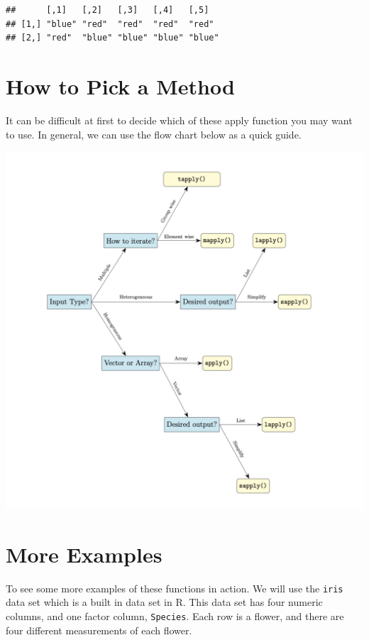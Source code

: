 \documentclass[
]{book}
\begin{document}
\begin{verbatim}
##      [,1]   [,2]   [,3]   [,4]   [,5]  
## [1,] "blue" "red"  "red"  "red"  "red" 
## [2,] "red"  "blue" "blue" "blue" "blue"
\end{verbatim}

\hypertarget{how-to-pick-a-method}{%
\section{How to Pick a Method}\label{how-to-pick-a-method}}

It can be difficult at first to decide which of these apply function you may want to use. In general, we can use the flow chart below as a quick guide.

\includegraphics{images/apply_flowchart.png}

\hypertarget{more-examples}{%
\section{More Examples}\label{more-examples}}

To see some more examples of these functions in action. We will use the \texttt{iris} data set which is a built in data set in R. This data set has four numeric columns, and one factor column, \texttt{Species}. Each row is a flower, and there are four different measurements of each flower.
\end{document}
